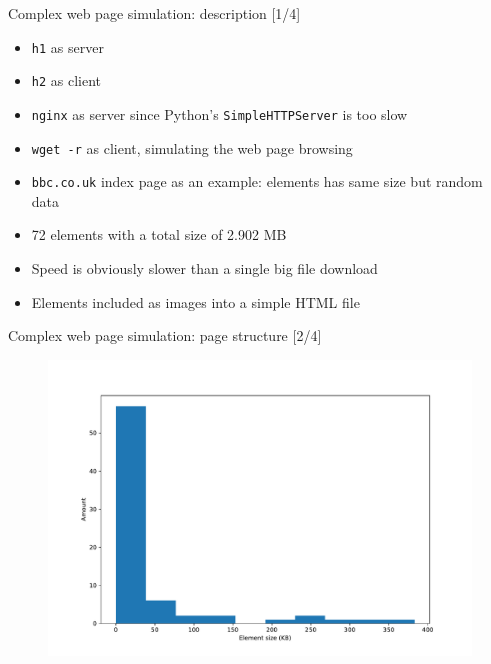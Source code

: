 \documentclass[13pt,aspectratio=43]{beamer}
\begin{document}
\begin{frame}{Complex web page simulation: description [1/4]}
	\begin{itemize}
		\item \texttt{h1} as server
		\item \texttt{h2} as client
		\item \texttt{nginx} as server since Python's \texttt{SimpleHTTPServer} is too slow
		\item \texttt{wget -r} as client, simulating the web page browsing
		\item \texttt{bbc.co.uk} index page as an example: elements has same size but random data
		\item 72 elements with a total size of 2.902 MB
		\item Speed is obviously slower than a single big file download
		\item Elements included as images into a simple HTML file
	\end{itemize}
\end{frame}

\begin{frame}{Complex web page simulation: page structure [2/4]}
  \begin{figure}
	  \includegraphics[width=\textwidth,height=\textheight,keepaspectratio]{../http_test/page_stat.pdf}
  \end{figure}

\end{frame}
\end{document}
